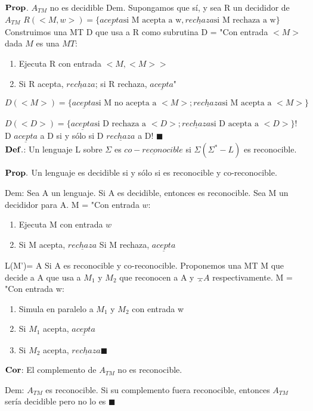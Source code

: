 \documentclass{homework}
\begin{document}
$\bf{Prop}$. $A_{TM}$ no es decidible
Dem. Supongamos que sí, y sea R un decididor de $A_{TM}$
$R(<M,w>) = \{ \underline{acepta} \text{si M acepta a w}, \underline{rechaza} \text{si M rechaza a w}\}$
Construimos una MT D que usa a R como subrutina
D = "Con entrada $<M>$ dada $M$ es una $MT$:
\begin{enumerate}
	\item Ejecuta R con entrada $<M, <M>>$
	\item Si R acepta, $\underline{rechaza}$; si R rechaza, $\underline{acepta}$"
\end{enumerate}
$D(<M>) = \{ \underline{acepta} \text{si M no acepta a }<M>; \underline{rechaza} \text{si M acepta a }<M>\}$

$D(<D>) = \{ \underline{acepta} \text{si D rechaza a }<D>; \underline{rechaza} \text{si D acepta a }<D>\}$!
D $\underline{acepta}$ a D si y sólo si D $\underline{rechaza}$ a D! $\blacksquare$\\

$\bf{Def.}$: Un lenguaje L sobre $\Sigma$ es $\underline{co-reconocible}$ si $\Sigma(\Sigma^{*} - L)$ es reconocible.

$\bf{Prop.}$ Un lenguaje es decidible si y sólo si es reconocible y co-reconocible.

Dem: Sea A un lenguaje. Si A es decidible, entonces es reconocible. Sea M un decididor para A.
M = "Con entrada $w$:
\begin{enumerate}
	\item Ejecuta M con entrada $w$
	\item Si M acepta, $\underline{rechaza}$
	Si M rechaza, $\underline{acepta}$
\end{enumerate}
L(M')= A
Si A es reconocible y co-reconocible.
Proponemos una MT M que decide a A que usa a $M_1$ y $M_2$ que reconocen a A y $\barwedge{A}$ respectivamente.
M = "Con entrada w:
\begin{enumerate}
	\item Simula en paralelo a $M_1$ y $M_2$ con entrada w
	\item Si $M_1$ acepta, $\underline{acepta}$
	\item Si $M_2$ acepta, $\underline{rechaza} \blacksquare$\\
\end{enumerate}

$\bf{Cor}$: El complemento de $A_{TM}$ no es reconocible.

Dem: $A_{TM}$ es reconocible. Si su complemento fuera reconocible, entonces $A_{TM}$ sería decidible pero no lo es $\blacksquare$\\
\end{document}
